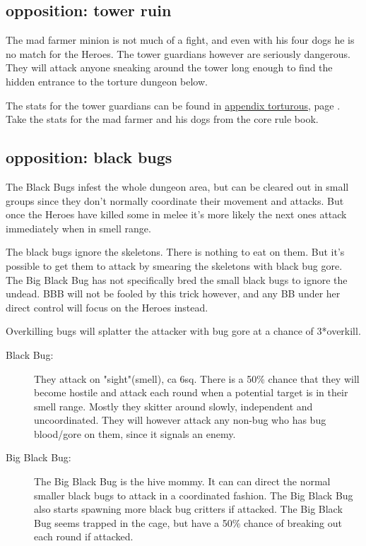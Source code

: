 \subsection*{opposition: tower ruin}

The mad farmer minion is not much of a fight, and even with his four dogs he is no match for the Heroes. The tower guardians however are seriously dangerous. They will attack anyone sneaking around the tower long enough to find the hidden entrance to the torture dungeon below.

The stats for the tower guardians can be found in \hyperref[appendixtorturous]{appendix torturous}, page \pageref{appendixtorturous}. Take the stats for the mad farmer and his dogs from the core rule book.


\subsection*{opposition: black bugs}

The Black Bugs infest the whole dungeon area, but can be cleared out in small groups since they don't normally coordinate their movement and attacks. But once the Heroes have killed some in melee it's more likely the next ones attack immediately when in smell range.

The black bugs ignore the skeletons. There is nothing to eat on them. But it's possible to get them to attack by smearing the skeletons with black bug gore. The Big Black Bug has not specifically bred the small black bugs to ignore the undead. BBB will not be fooled by this trick however, and any BB under her direct control will focus on the Heroes instead.

Overkilling bugs will splatter the attacker with bug gore at a chance of 3*overkill.


\begin{description}

\item[Black Bug:] They attack on "sight"(smell), ca 6sq. There is a 50\% chance that they will become hostile and attack each round when a potential target is in their smell range. Mostly they skitter around slowly, independent and uncoordinated. They will however attack any non-bug who has bug blood/gore on them, since it signals an enemy.

\item[Big Black Bug:] The Big Black Bug is the hive mommy. It can can direct the normal smaller black bugs to attack in a coordinated fashion. The Big Black Bug also starts spawning more black bug critters if attacked. The Big Black Bug seems trapped in the cage, but have a 50\% chance of breaking out each round if attacked.

\end{description}

